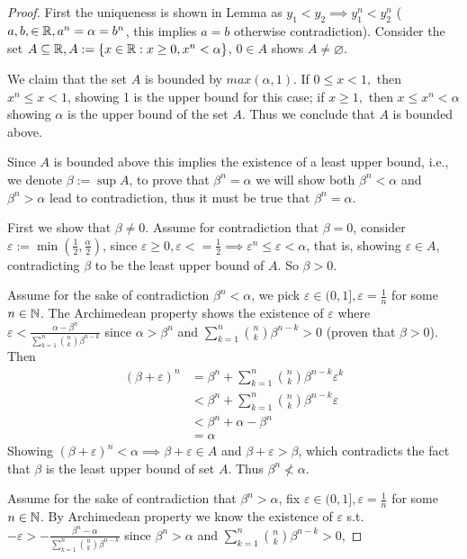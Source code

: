 \documentclass{homework}
\newcommand{\R}{\bb{R}} %
\newcommand{\N}{\bb{N}} %
\newcommand{\?}{\stackrel{?}{=}}
\newcommand{\ep}{\varepsilon}
\theoremstyle{definition}
\begin{document}
\begin{proof}
    First the uniqueness is shown in Lemma as $y_1<y_2\implies y_1^n<y_2^n$ ($a,b,\in\R, a^n=\alpha=b^n$, this implies $a=b$ otherwise contradiction). Consider the set $A\subseteq\R, A:=\{x\in\R:x\geq0,x^n<\alpha\}$, $0\in A$ shows $A\neq\varnothing$.

    We claim that the set $A$ is bounded by $max(\alpha, 1)$. If $0\leq x<1, $ then $x^n\leq x<1$, showing 1 is the upper bound for this case; if $x\geq1,$ then $x\leq x^n<\alpha$ showing $\alpha$ is the upper bound of the set $A$. Thus we conclude that $A$ is bounded above. 

    Since $A$ is bounded above this implies the existence of a least upper bound, i.e., we denote $\beta:=\sup A$, to prove that $\beta^n=\alpha$ we will show both $\beta^n<\alpha$ and $\beta^n>\alpha$ lead to contradiction, thus it must be true that $\beta^n=\alpha$. 

    First we show that $\beta\neq0$. Assume for contradiction that $\beta=0$, consider $\ep:=\min(\frac12,\frac{\alpha}2)$, since $\ep\geq0, \ep<=\frac12\implies\ep^n\leq\ep<\alpha$, that is, showing $\ep\in A$, contradicting $\beta$ to be the least upper bound of $A$. So $\beta>0$. 

    Assume for the sake of contradiction $\beta^n<\alpha$, we pick $\ep\in(0,1], \ep=\frac1n$ for some $n\in\N$. The Archimedean property shows the existence of $\ep$ where $\ep<\frac{\alpha-\beta^n}{\sum_{k=1}^n\binom{n}{k}\beta^{n-k}}$ since $\alpha>\beta^n$ and $\sum_{k=1}^n\binom{n}{k}\beta^{n-k}>0$ (proven that $\beta>0$). Then \begin{align*}
        (\beta+\ep)^n &= \beta^n + \sum_{k=1}^n\binom{n}{k}\beta^{n-k}\ep^k\\
        &<\beta^n + \sum_{k=1}^n\binom{n}{k}\beta^{n-k}\ep\\
        &<\beta^n + \alpha - \beta^n\\
        &= \alpha
    \end{align*} 
    Showing $(\beta+\ep)^n<\alpha\implies\beta+\ep\in A$ and $\beta+\ep>\beta$, which contradicts the fact that $\beta$ is the least upper bound of set $A$. Thus $\beta^n\not<\alpha$. 

    Assume for the sake of contradiction that $\beta^n>\alpha$, fix $\ep\in(0,1],\ep=\frac1n$ for some $n\in\N$. By Archimedean property we know the existence of $\ep$ s.t. $-\ep>-\frac{\beta^n-\alpha}{\sum_{k=1}^n\binom{n}{k}\beta^{n-k}}$ since $\beta^n>\alpha$ and $\sum_{k=1}^n\binom{n}{k}\beta^{n-k}>0$,


\end{proof}
\end{document}
